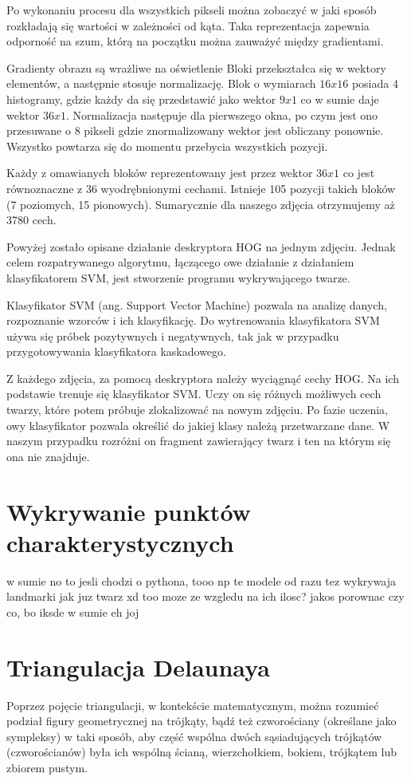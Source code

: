 Po wykonaniu procesu dla wszystkich pikseli można zobaczyć w jaki sposób rozkładają się wartości w zależności od kąta. Taka reprezentacja zapewnia odporność na szum, którą na początku można zauważyć między gradientami.

Gradienty obrazu są wrażliwe na oświetlenie
Bloki przekształca się w wektory elementów, a następnie stosuje normalizację. Blok o wymiarach $16x16$ posiada 4 histogramy, gdzie każdy da się przedstawić jako wektor $9x1$ co w sumie daje wektor $36x1$. Normalizacja następuje dla pierwszego okna, po czym jest ono przesuwane o 8 pikseli gdzie znormalizowany wektor jest obliczany ponownie. Wszystko powtarza się do momentu przebycia wszystkich pozycji.

Każdy z omawianych bloków reprezentowany jest przez wektor $36x1$ co jest równoznaczne z 36 wyodrębnionymi cechami. Istnieje 105 pozycji takich bloków (7 poziomych, 15 pionowych). Sumarycznie dla naszego zdjęcia otrzymujemy aż 3780 cech.

Powyżej zostało opisane działanie deskryptora HOG na jednym zdjęciu. Jednak celem rozpatrywanego algorytmu, łączącego owe działanie z działaniem klasyfikatorem SVM, jest stworzenie programu wykrywającego twarze.

Klasyfikator SVM (ang. Support Vector Machine) pozwala na analizę danych, rozpoznanie wzorców i ich klasyfikację. Do wytrenowania klasyfikatora SVM używa się próbek pozytywnych i negatywnych, tak jak w przypadku przygotowywania klasyfikatora kaskadowego.

Z każdego zdjęcia, za pomocą deskryptora należy wyciągnąć cechy HOG. Na ich podstawie trenuje się klasyfikator SVM. Uczy on się różnych możliwych cech twarzy, które potem próbuje zlokalizować na nowym zdjęciu. Po fazie uczenia, owy klasyfikator pozwala określić do jakiej klasy należą przetwarzane dane. W naszym przypadku rozróżni on fragment zawierający twarz i ten na którym się ona nie znajduje. 


\section{Wykrywanie punktów charakterystycznych}
w sumie no to jesli chodzi o pythona, tooo np te modele od razu tez wykrywaja landmarki jak juz twarz xd too moze ze wzgledu na ich ilosc? jakos porownac czy co, bo iksde w sumie eh joj

\section{Triangulacja Delaunaya}
Poprzez pojęcie triangulacji, w kontekście matematycznym, można rozumieć podział figury geometrycznej na trójkąty, bądź też czworościany (określane jako sympleksy) w taki sposób, aby część wspólna dwóch sąsiadujących trójkątów (czworościanów) była ich wspólną ścianą, wierzchołkiem, bokiem, trójkątem lub zbiorem pustym. \cite{triangulation}

